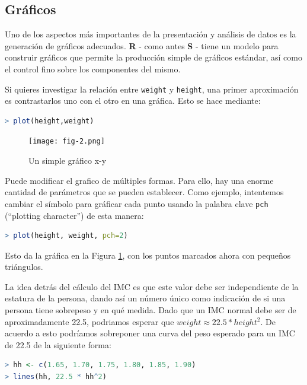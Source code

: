 \subsection{Gráficos}\label{graficos}

Uno de los aspectos más importantes de la presentación y análisis de datos es
la generación de gráficos adecuados. \textbf{R} - como antes \textbf{S} - tiene
un modelo para construir gráficos que permite la producción simple de gráficos
estándar, así como el control fino sobre los componentes del mismo.

Si quieres investigar la relación entre  \texttt{weight} y \texttt{height}, una
primer aproximación es contrastarlos uno con el otro en una gráfica. Esto se
hace mediante:

\begin{lstlisting}[language=R]
> plot(height,weight)
\end{lstlisting}

\begin{figure}[H]
  \texttt{[image: fig-2.png]}
  \caption{Un simple gráfico x-y}
  \label{fig:fig-2}
\end{figure}

Puede modificar el grafico de múltiples formas. Para ello, hay una enorme
cantidad de parámetros que se pueden establecer. Como ejemplo, intentemos
cambiar el símbolo para gráficar cada punto usando la palabra clave
\texttt{pch} (``plotting character'') de esta manera:

\begin{lstlisting}[language=R]
> plot(height, weight, pch=2)
\end{lstlisting}

Esto da la gráfica en la Figura \ref{fig:fig-2}, con los puntos marcados ahora
con pequeños triángulos.

La idea detrás del cálculo del IMC es que este valor debe ser independiente de
la estatura de la persona, dando así un número único como indicación de si una
persona tiene sobrepeso y en qué medida. Dado que un IMC normal debe ser de
aproximadamente 22.5, podriamos esperar que $weight \approx 22.5 * height^2$.
De acuerdo a esto podríamos sobreponer una curva del peso esperado para un IMC
de 22.5 de la siguiente forma:

\begin{lstlisting}[language=R]
> hh <- c(1.65, 1.70, 1.75, 1.80, 1.85, 1.90)
> lines(hh, 22.5 * hh^2)
\end{lstlisting}

